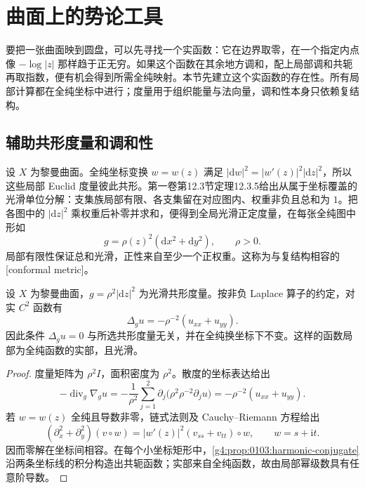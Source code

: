 
% 
% 

\section{曲面上的势论工具}
\label{g4:sec:0501}

要把一张曲面映到圆盘，可以先寻找一个实函数：它在边界取零，在一个指定内点像 \(-\log|z|\) 那样趋于正无穷。如果这个函数在其余地方调和，配上局部调和共轭再取指数，便有机会得到所需全纯映射。本节先建立这个实函数的存在性。所有局部计算都在全纯坐标中进行；度量用于组织能量与法向量，调和性本身只依赖复结构。

\subsection{辅助共形度量和调和性}
\label{g4:subsec:0501:01}

设 \(X\) 为黎曼曲面。全纯坐标变换 \(w=w(z)\) 满足 \(|\mathrm{d}w|^2=|w'(z)|^2|\mathrm{d}z|^2\)，所以这些局部 Euclid 度量彼此共形。第一卷第12.3节定理12.3.5给出从属于坐标覆盖的光滑单位分解：支集族局部有限、各支集留在对应图内、权重非负且总和为 \(1\)。把各图中的 \(|\mathrm{d}z|^2\) 乘权重后补零并求和，便得到全局光滑正定度量，在每张全纯图中形如
\[
	g=\rho(z)^2(\mathrm{d}x^2+\mathrm{d}y^2),\qquad \rho>0.
\]
局部有限性保证总和光滑，正性来自至少一个正权重。这称为与复结构相容的[conformal metric]。

\begin{proposition}
	\label{g4:prop:0501:conformal-harmonicity}
	设 \(X\) 为黎曼曲面，\(g=\rho^2|\mathrm{d}z|^2\) 为光滑共形度量。按非负 Laplace 算子的约定，对实 \(C^2\) 函数有
	\begin{equation}
		\label{g4:eq:0501:laplacian}
		\Delta_g u=-\rho^{-2}(u_{xx}+u_{yy}).
	\end{equation}
	因此条件 \(\Delta_g u=0\) 与所选共形度量无关，并在全纯换坐标下不变。这样的函数局部为全纯函数的实部，且光滑。
\end{proposition}
\begin{proof}
	度量矩阵为 \(\rho^2I\)，面积密度为 \(\rho^2\)。散度的坐标表达给出
	\[
		-\operatorname{div}_g\nabla_g u
		=-\frac1{\rho^2}\sum_{j=1}^2
		\partial_j\bigl(\rho^2\rho^{-2}\partial_j u\bigr)
		=-\rho^{-2}(u_{xx}+u_{yy}).
	\]
	若 \(w=w(z)\) 全纯且导数非零，链式法则及 Cauchy--Riemann 方程给出
	\[
		(\partial_x^2+\partial_y^2)(v\circ w)
		=|w'(z)|^2(v_{ss}+v_{tt})\circ w,
		\qquad w=s+\mathrm{i}t.
	\]
	因而零解在坐标间相容。在每个小坐标矩形中，\cref{g4:prop:0103:harmonic-conjugate}沿两条坐标线的积分构造出共轭函数；实部来自全纯函数，故由局部幂级数具有任意阶导数。
\end{proof}

